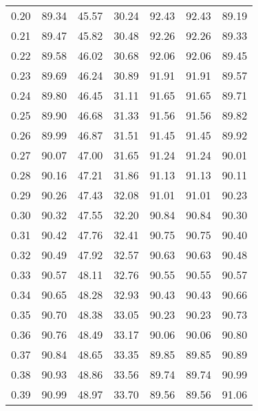 \begin{tabular}{|c|c|c|c|c|c|c|}
      0.20 &     89.34 &     45.57 &      30.24 &   92.43 &      92.43 &         89.19 \\
      0.21 &     89.47 &     45.82 &      30.48 &   92.26 &      92.26 &         89.33 \\
      0.22 &     89.58 &     46.02 &      30.68 &   92.06 &      92.06 &         89.45 \\
      0.23 &     89.69 &     46.24 &      30.89 &   91.91 &      91.91 &         89.57 \\
      0.24 &     89.80 &     46.45 &      31.11 &   91.65 &      91.65 &         89.71 \\
      0.25 &     89.90 &     46.68 &      31.33 &   91.56 &      91.56 &         89.82 \\
      0.26 &     89.99 &     46.87 &      31.51 &   91.45 &      91.45 &         89.92 \\
      0.27 &     90.07 &     47.00 &      31.65 &   91.24 &      91.24 &         90.01 \\
      0.28 &     90.16 &     47.21 &      31.86 &   91.13 &      91.13 &         90.11 \\
      0.29 &     90.26 &     47.43 &      32.08 &   91.01 &      91.01 &         90.23 \\
      0.30 &     90.32 &     47.55 &      32.20 &   90.84 &      90.84 &         90.30 \\
      0.31 &     90.42 &     47.76 &      32.41 &   90.75 &      90.75 &         90.40 \\
      0.32 &     90.49 &     47.92 &      32.57 &   90.63 &      90.63 &         90.48 \\
      0.33 &     90.57 &     48.11 &      32.76 &   90.55 &      90.55 &         90.57 \\
      0.34 &     90.65 &     48.28 &      32.93 &   90.43 &      90.43 &         90.66 \\
      0.35 &     90.70 &     48.38 &      33.05 &   90.23 &      90.23 &         90.73 \\
      0.36 &     90.76 &     48.49 &      33.17 &   90.06 &      90.06 &         90.80 \\
      0.37 &     90.84 &     48.65 &      33.35 &   89.85 &      89.85 &         90.89 \\
      0.38 &     90.93 &     48.86 &      33.56 &   89.74 &      89.74 &         90.99 \\
      0.39 &     90.99 &     48.97 &      33.70 &   89.56 &      89.56 &         91.06 \\

\end{tabular}
